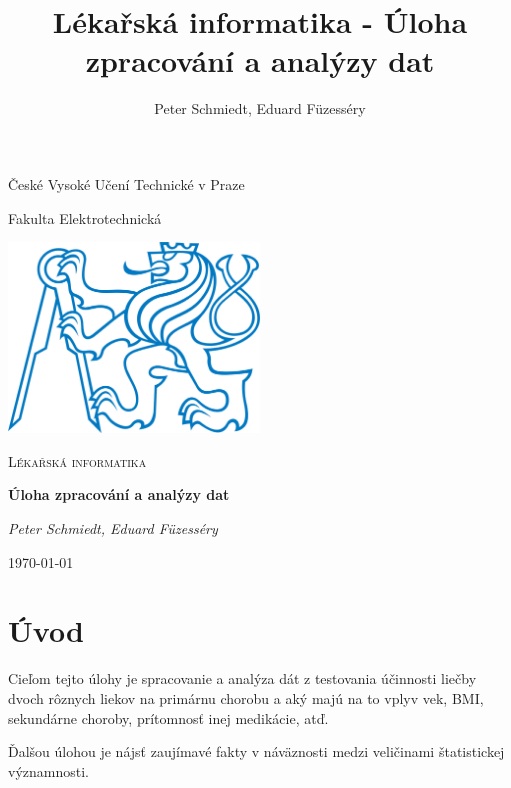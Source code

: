 \documentclass[11pt, a4paper]{article}
\author{Peter Schmiedt, Eduard Füzesséry}
\title{Lékařská informatika - Úloha zpracování a analýzy dat}
\begin{document}

\begin{titlepage}

	\centering
	{\huge České Vysoké Učení Technické v Praze \par}
	\vspace{0.5cm}
	{\Large Fakulta Elektrotechnická \par}
	\vspace{1cm}
	\includegraphics[width=0.5\textwidth]{cvut}\par\vspace{1cm}
	\vspace{1cm}
	{\scshape\Large Lékařská informatika\par}
	{\huge\bfseries Úloha zpracování a analýzy dat\par}
	\vspace{2cm}
	{\Large\itshape Peter Schmiedt, Eduard Füzesséry\par}
	\vfill

	{\large \today\par}

\end{titlepage}


\section{Úvod}
Cieľom tejto úlohy je spracovanie a analýza dát z testovania účinnosti liečby dvoch rôznych liekov na primárnu chorobu a aký majú na to vplyv vek, BMI, sekundárne choroby, prítomnosť inej medikácie, atď.


Ďalšou úlohou je nájsť zaujímavé fakty v náväznosti medzi veličinami štatistickej významnosti.









{}


\appendix


\end{document}
